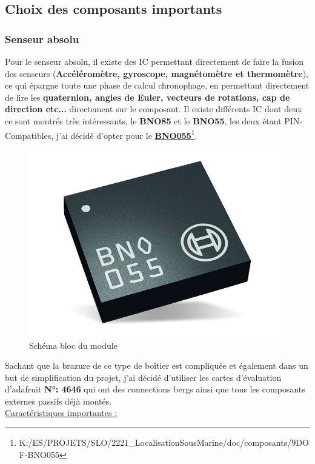 \subsection{Choix des composants importants} \label{ssec:num02}
{

\subsubsection{Senseur absolu}
{
    Pour le senseur absolu, il existe des IC permettant directement de faire la fusion des senseurs (\textbf{Accéléromètre, gyroscope, magnétomètre et thermomètre}), ce qui épargne toute une phase de calcul chronophage, en permettant directement de lire les \textbf{quaternion, angles de Euler, vecteurs de rotations, cap de direction etc...} directement sur le composant. Il existe différents IC dont deux ce sont montrés très intéressants, le \textbf{BNO85} et le \textbf{BNO55}, les deux étant PIN-Compatibles, j'ai décidé d'opter pour le \textbf{\underline{BNO055}}\footnote{K:/ES/PROJETS/SLO/2221\_LocalisationSousMarine/doc/composants/9DOF-BNO055}.
    
    \begin{figure}[h]
    \centering
    \includegraphics[width=.4\textwidth]{Figures/BNO055-Illustration}
    \caption{Schéma bloc du module}
    \label{fig:SchemaBloc}
    \end{figure}
    
    Sachant que la brazure de ce type de boîtier est compliquée et également dans un but de simplification du projet, j'ai décidé d'utiliser les cartes d'évaluation d'adafruit \textbf{N°: 4646} qui ont des connections bergs ainsi que tous les composants externes passifs déjà montés. \\
    
    \underline{Caractéristiques importantes :} \\
    
}}
